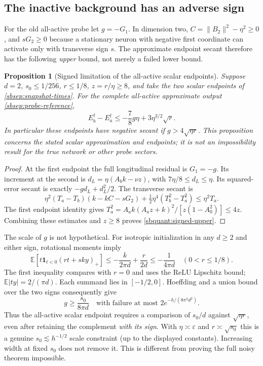 \documentclass[11pt]{article}
\newtheorem{proposition}[theorem]{Proposition}
\theoremstyle{remark}
\begin{document}
\subsection{The inactive background has an adverse sign}

For the old all-active probe let $g=-G_1$. In dimension two,
$C=\|B_2\|^2-\eta^2\ge0$, and $sG_2\ge0$ because a stationary neuron
with negative first coordinate can activate only with transverse sign $s$.
The approximate endpoint secant therefore has the following \emph{upper}
bound, not merely a failed lower bound.

\begin{proposition}[Signed limitation of the all-active scalar endpoints]
\label{sbquant:signed-obstruction}
Suppose $d=2$, $s_0\le1/256$, $r\le1/8$, $z=r/\eta\ge8$, and take
the two scalar endpoints of \eqref{sbsep:snapshot-times}. For the complete
all-active approximate output \eqref{sbsep:probe-reference},
\begin{equation}\label{sbquant:signed-upper}
 E_b^\dagger-E_a^\dagger
 \le-\frac78g\eta+3\eta^{3/2}\sqrt r.
\end{equation}
In particular these endpoints have \emph{negative} secant if
$g>4\sqrt{\eta r}$. This proposition concerns the stated scalar
approximation and endpoints; it is not an impossibility result for the
true network or other probe sectors.
\end{proposition}
\begin{proof}
At the first endpoint the full longitudinal residual is $G_1=-g$.
Its increment at the second is
$d_L=\eta(A_bk-\nu z)$, with $7\eta/8\le d_L\le\eta$.
Its squared-error secant is exactly $-gd_L+d_L^2/2$.
The transverse secant is
\[
 \eta^2(T_a-T_b)(k-kC-sG_2)
 +\tfrac12\eta^4(T_b^2-T_a^2)
 \le\eta^2T_a.
\]
The first endpoint identity gives
$T_a^2=A_ak(A_az+k)^2/[z(1-A_0^2)]\le4z$.
Combining these estimates and $z\ge8$ proves
\eqref{sbquant:signed-upper}.
\end{proof}

The scale of $g$ is not hypothetical. For isotropic initialization in any
$d\ge2$ and either sign, rotational moments imply
\[
 \mathbb E[t\mathbf1_{t<0}(rt+sky)_+]
 \le-\frac{k}{2\pi d}+\frac r{2d}
 \le-\frac1{4\pi d}\quad(0<r\le1/8).
\]
The first inequality compares with $r=0$ and uses the ReLU Lipschitz
bound; $\mathbb E|ty|=2/(\pi d)$. Each summand lies in $[-1/2,0]$.
Hoeffding and a union bound over the two signs consequently give
\begin{equation}\label{sbquant:background-size}
 g\ge\frac{s_0}{8\pi d}
 \quad\text{with failure at most }2e^{-h/(8\pi^2d^2)}.
\end{equation}
Thus the all-active scalar endpoint requires a comparison of
$s_0/d$ against $\sqrt{\eta r}$, even after retaining the complement
\emph{with its sign}. With $\eta\asymp\varepsilon$ and
$r\asymp\sqrt{s_0}$ this is a genuine $s_0\lesssim h^{-1/2}$ scale
constraint (up to the displayed constants). Increasing width at fixed
$s_0$ does not remove it. This is different from proving the full noisy
theorem impossible.
\end{document}
